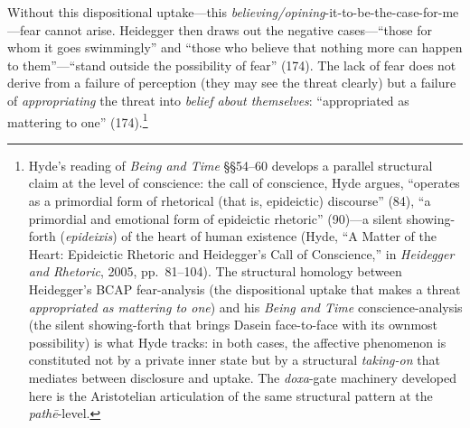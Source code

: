 Without this dispositional uptake---this \textit{believing/opining}-it-to-be-the-case-for-me---fear cannot arise. Heidegger then draws out the negative cases---``those for whom it goes swimmingly'' and ``those who believe that nothing more can happen to them''---``stand outside the possibility of fear'' (174). The lack of fear does not derive from a failure of perception (they may see the threat clearly) but a failure of \textit{appropriating} the threat into \textit{belief about themselves}: ``appropriated as mattering to one'' (174).\footnote{Hyde's reading of \textit{Being and Time} \S\S 54--60 develops a parallel structural claim at the level of conscience: the call of conscience, Hyde argues, ``operates as a primordial form of rhetorical (that is, epideictic) discourse'' (84), ``a primordial and emotional form of epideictic rhetoric'' (90)---a silent showing-forth (\textit{epideixis}) of the heart of human existence (Hyde, ``A Matter of the Heart: Epideictic Rhetoric and Heidegger's Call of Conscience,'' in \textit{Heidegger and Rhetoric}, 2005, pp.~81--104). The structural homology between Heidegger's BCAP fear-analysis (the dispositional uptake that makes a threat \textit{appropriated as mattering to one}) and his \textit{Being and Time} conscience-analysis (the silent showing-forth that brings Dasein face-to-face with its ownmost possibility) is what Hyde tracks: in both cases, the affective phenomenon is constituted not by a private inner state but by a structural \textit{taking-on} that mediates between disclosure and uptake. The \textit{doxa}-gate machinery developed here is the Aristotelian articulation of the same structural pattern at the \textit{pathē}-level.}

